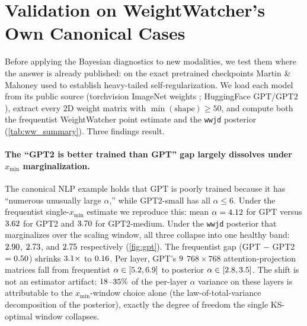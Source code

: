 \section{Validation on WeightWatcher's Own Canonical Cases}
\label{sec:ww_replication}

Before applying the Bayesian diagnostics to new modalities, we test them where the
answer is already published: on the exact pretrained checkpoints Martin \& Mahoney
used to establish heavy-tailed self-regularization. We load each model from its public
source (torchvision ImageNet weights \citep{simonyan2015vgg}; HuggingFace GPT/GPT2
\citep{radford2019gpt2}), extract every 2D weight matrix with $\min(\text{shape}) \geq
50$, and compute both the frequentist WeightWatcher point estimate and the \texttt{wwjd}
posterior (\cref{tab:ww_summary}). Three findings result.

\paragraph{The ``GPT2 is better trained than GPT'' gap largely dissolves under $x_{\min}$ marginalization.}
The canonical NLP example holds that GPT is poorly trained because it has ``numerous
unusually large $\alpha$,'' while GPT2-small has all $\alpha \leq 6$. Under the
frequentist single-$x_{\min}$ estimate we reproduce this: mean $\alpha = 4.12$ for
GPT versus $3.62$ for GPT2 and $3.70$ for GPT2-medium. Under the
\texttt{wwjd} posterior that marginalizes over the scaling window, all three collapse
into one healthy band: $2.90$, $2.73$, and $2.75$
respectively (\cref{fig:gpt}). The frequentist gap (GPT $-$ GPT2 $= 0.50$)
shrinks $3.1\times$ to $0.16$. Per layer, GPT's $9$
$768\times768$ attention-projection matrices fall from frequentist $\alpha \in
[5.2, 6.9]$ to posterior $\alpha \in
[2.8, 3.5]$. The shift is not an estimator artifact:
$18$--$35\%$ of the per-layer $\alpha$ variance on these
layers is attributable to the $x_{\min}$-window choice alone (the law-of-total-variance
decomposition of the posterior), exactly the degree of freedom the single KS-optimal
window collapses.


